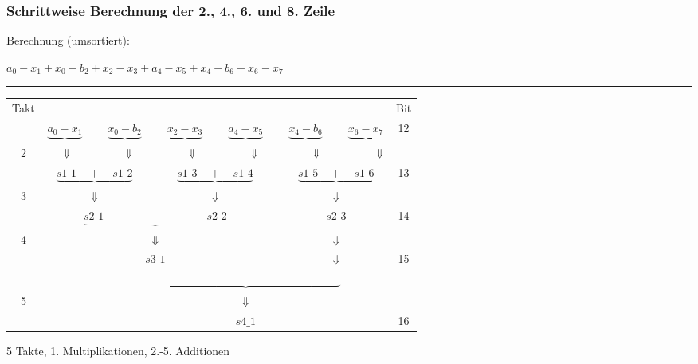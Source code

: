 \begin{frame}\frametitle{Schrittweise Berechnung der 2., 4., 6. und 8. Zeile}
 Berechnung (umsortiert):
 \begin{center} 
 $a_0 - x_1 + x_0 - b_2 + x_2 - x_3 + a_4 - x_5 + x_4 - b_6 + x_6 - x_7$\\
 \end{center}
 \hrule
 
 \vspace{0.3cm}
\begin{table}
\hspace{-1cm}
\begin{tabular}{ccccccccccccc}
Takt&\multicolumn{11}{c}{}&Bit\\
&$\underbrace{a_0 - x_1}$ &  &$ \underbrace{x_0 - b_2}$ &  &$\underbrace{x_2 - x_3}$ &  &$\underbrace{a_4 - x_5}$ &  &$\underbrace{x_4 - b_6}$ &  &$\underbrace{x_6 - x_7}$&12\\
2&\multicolumn{11}{l}{$\hspace{0.5cm} \Downarrow \hspace{1.75cm} \Downarrow \hspace{1.8cm} \Downarrow \hspace{1.75cm}\Downarrow \hspace{1.75cm}\Downarrow \hspace{1.8cm}\Downarrow$}&\\
&\multicolumn{3}{c}{$\underbrace{s1\_1 \quad + \quad s1\_2}$} & & \multicolumn{3}{c}{$\underbrace{s1\_3 \quad + \quad s1\_4}$} & & \multicolumn{3}{c}{$\underbrace{s1\_5 \quad + \quad s1\_6}$}&13\\
3&\multicolumn{3}{c}{$\Downarrow$} & & \multicolumn{3}{c}{$\Downarrow$} & & \multicolumn{3}{c}{$\Downarrow$}&\\
&\multicolumn{7}{c}{$\underbrace{s2\_1 \quad  \quad \quad \quad + \quad \quad \quad  \quad s2\_2}$} & & \multicolumn{3}{c}{$s2\_3$}&14\\
4&\multicolumn{7}{c}{$\Downarrow$}& & \multicolumn{3}{c}{$\Downarrow$}&\\
&\multicolumn{7}{c}{$s3\_1$}& & \multicolumn{3}{c}{$\Downarrow$}&15\\
&\multicolumn{2}{c}{}& \multicolumn{9}{c}{$\underbrace{\quad \quad \quad \quad \quad \quad \quad \quad \quad \quad \quad \quad \quad \quad \quad \quad \quad}$}&\\
5&\multicolumn{2}{c}{}& \multicolumn{9}{c}{$\Downarrow$}&\\
&\multicolumn{2}{c}{}& \multicolumn{9}{c}{$s4\_1$}&16
\end{tabular}
\end{table}

5 Takte, 1. Multiplikationen, 2.-5. Additionen
 
\end{frame}


